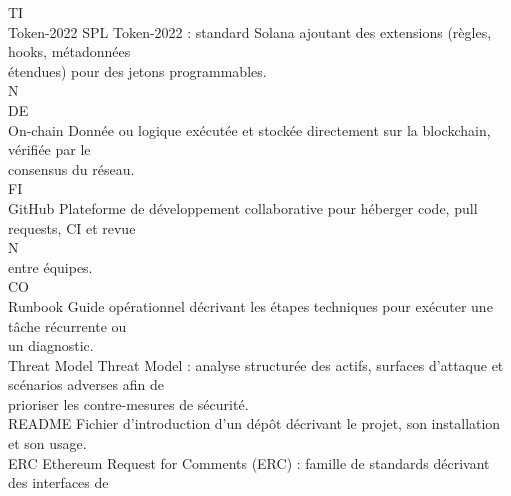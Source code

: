\vspace{0.5em}
TI\\
Token-2022                              SPL Token-2022 : standard Solana ajoutant des extensions (règles, hooks, métadonnées\\
étendues) pour des jetons programmables.\\
\vspace{0.5em}
\vspace{0.5em}
\vspace{0.5em}
\vspace{0.5em}
N\\
DE\\
On-chain                                Donnée ou logique exécutée et stockée directement sur la blockchain, vérifiée par le\\
consensus du réseau.\\
\vspace{0.5em}
\vspace{0.5em}
\vspace{0.5em}
\vspace{0.5em}
FI\\
GitHub                                  Plateforme de développement collaborative pour héberger code, pull requests, CI et revue\\
\vspace{0.5em}
\vspace{0.5em}
\vspace{0.5em}
N\\
entre équipes.\\
CO\\
Runbook                                 Guide opérationnel décrivant les étapes techniques pour exécuter une tâche récurrente ou\\
un diagnostic.\\
\vspace{0.5em}
Threat Model                            Threat Model : analyse structurée des actifs, surfaces d’attaque et scénarios adverses afin de\\
prioriser les contre-mesures de sécurité.\\
\vspace{0.5em}
README                                  Fichier d’introduction d’un dépôt décrivant le projet, son installation et son usage.\\
\vspace{0.5em}
ERC                                     Ethereum Request for Comments (ERC) : famille de standards décrivant des interfaces de\\
